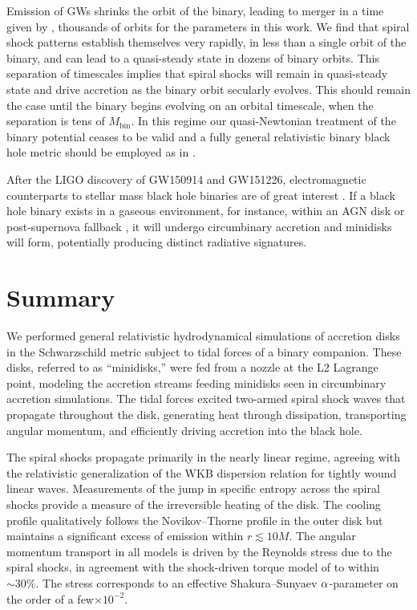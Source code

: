 Emission of GWs shrinks the orbit of the binary, leading to merger in a time given by , thousands of orbits for the parameters in this work.  We find that spiral shock patterns establish themselves very rapidly, in less than a single orbit of the binary, and can lead to a quasi-steady state in dozens of binary orbits.  This separation of timescales implies that spiral shocks will remain in quasi-steady state and drive accretion as the binary orbit secularly evolves.  This should remain the case until the binary begins evolving on an orbital timescale, when the separation is tens of $M_\text{bin}$. In this regime our quasi-Newtonian treatment of the binary potential ceases to be valid and a fully general relativistic binary black hole metric should be employed as in \cite{Farris12,Noble12,Zilhao15}.

After the LIGO discovery of GW150914 and GW151226, electromagnetic counterparts to stellar mass black hole binaries are of great interest \citep{LIGO16GW150914Discovery, LIGO16GW151226}.  If a black hole binary exists in a gaseous environment, for instance, within an AGN disk \citep{Bartos16, Stone17} or post-supernova fallback \citep{Perna16}, it will undergo circumbinary accretion and minidisks will form, potentially producing distinct radiative signatures.  



\section{Summary}


We performed general relativistic hydrodynamical simulations of accretion disks in the Schwarzschild metric subject to tidal forces of a binary companion.  These disks, referred to as ``minidisks,'' were fed from a nozzle at the L2 Lagrange point, modeling the accretion streams feeding minidisks seen in circumbinary accretion simulations.  The tidal forces excited two-armed spiral shock waves that propagate throughout the disk,  generating heat through dissipation, transporting angular momentum, and efficiently driving accretion into the black hole.

The spiral shocks propagate primarily in the nearly linear regime, agreeing with the relativistic generalization of the WKB dispersion relation for tightly wound linear waves.  Measurements of the jump in specific entropy across the spiral shocks provide a measure of the irreversible heating of the disk.  The cooling profile qualitatively follows the Novikov--Thorne profile in the outer disk but maintains a significant excess of emission within $r \lesssim 10 M$.  The angular momentum transport in all models is driven by the Reynolds stress due to the spiral shocks, in agreement with the shock-driven torque model of \cite{Rafikov16} to within $\sim30\%$.  The stress corresponds to an effective Shakura--Sunyaev $\alpha$-parameter on the order of a few$\times 10^{-2}$.

